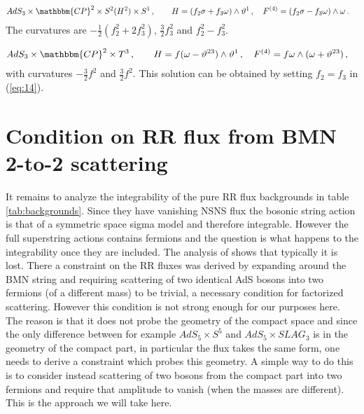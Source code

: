 \documentclass[a4paper,11pt]{article}
\begin{document}
\begin{align}
&AdS_3\times\mathbbm{CP}^2\times S^2(H^2)\times S^1\,,\qquad
H=(f_2\sigma+f_3\omega)\wedge\vartheta^1\,,\quad
F^{(4)}=(f_2\sigma-f_3\omega)\wedge\omega\,.
\label{eq:14}
\end{align}
The curvatures are $-\frac12(f_2^2+2f_3^2)$, $\frac32f_3^2$ and $f_2^2-f_3^2$.

\begin{align}
&AdS_3\times\mathbbm{CP}^2\times T^3\,,\qquad
H=f(\omega-\vartheta^{23})\wedge\vartheta^1\,,\quad
F^{(4)}=f\omega\wedge(\omega+\vartheta^{23})\,,
\end{align}
with curvatures $-\frac32f^2$ and $\frac32f^2$. This solution can be obtained by setting $f_2=f_3$ in (\ref{eq:14}).

\fi


\section{Condition on RR flux from BMN 2-to-2 scattering}
It remains to analyze the integrability of the pure RR flux backgrounds in table \ref{tab:backgrounds}. Since they have vanishing NSNS flux the bosonic string action is that of a symmetric space sigma model and therefore integrable. However the full superstring actions contains fermions and the question is what happens to the integrability once they are included. The analysis of \cite{Wulff:2017lxh} shows that typically it is lost. There a constraint on the RR fluxes was derived by expanding around the BMN string and requiring scattering of two identical AdS bosons into two fermions (of a different mass) to be trivial, a necessary condition for factorized scattering. However this condition is not strong enough for our purposes here. The reason is that it does not probe the geometry of the compact space and since the only difference between for example $AdS_5\times S^5$ and $AdS_5\times SLAG_3$ is in the geometry of the compact part, in particular the flux takes the same form, one needs to derive a constraint which probes this geometry. A simple way to do this is to consider instead scattering of two bosons from the compact part into two fermions and require that amplitude to vanish (when the masses are different). This is the approach we will take here.
\end{document}

